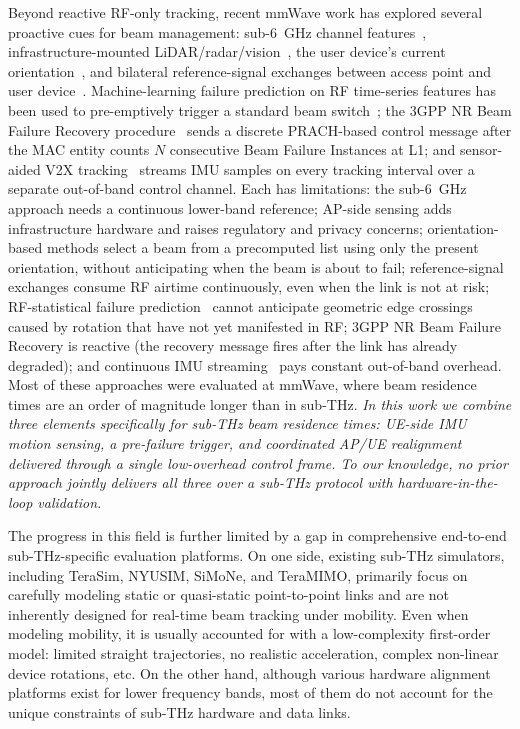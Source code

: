 \documentclass[fleqn,10pt]{wlscirep}
\newcommand{\rev}[1]{#1}
\begin{document}
Beyond reactive RF-only tracking, recent mmWave work has explored several proactive cues for beam management: sub-6~GHz channel features~\cite{Alrabeiah2020DeepLearning}, infrastructure-mounted LiDAR/radar/vision~\cite{Alkhateeb2023DeepSense, Jiang2023LiDAR, Morais2023Position}, the user device's current orientation~\cite{Rezaie2022Orientation, Struye2023CoVRage}, and bilateral reference-signal exchanges between access point and user device~\cite{Alkhateeb2018DLCB, Xue2023Standardization, Heng2021SixChallenges}. \rev{Machine-learning failure prediction on RF time-series features has been used to pre-emptively trigger a standard beam switch~\cite{9838772}; the 3GPP NR Beam Failure Recovery procedure~\cite{Giordani2018ATO, Heng2021SixChallenges} sends a discrete PRACH-based control message after the MAC entity counts $N$ consecutive Beam Failure Instances at L1; and sensor-aided V2X tracking~\cite{Brambilla_2019} streams IMU samples on every tracking interval over a separate out-of-band control channel.} Each has limitations: the sub-6~GHz approach needs a continuous lower-band reference; AP-side sensing adds infrastructure hardware and raises regulatory and privacy concerns; orientation-based methods select a beam from a precomputed list using only the present orientation, without anticipating when the beam is about to fail; reference-signal exchanges consume RF airtime continuously, even when the link is not at risk; \rev{RF-statistical failure prediction~\cite{9838772} cannot anticipate geometric edge crossings caused by rotation that have not yet manifested in RF; 3GPP NR Beam Failure Recovery is reactive (the recovery message fires after the link has already degraded); and continuous IMU streaming~\cite{Brambilla_2019} pays constant out-of-band overhead}. Most of these approaches were evaluated at mmWave, where beam residence times are an order of magnitude longer than in sub-THz. \emph{In this work we combine three elements specifically for sub-THz beam residence times: UE-side IMU motion sensing, a pre-failure trigger, and coordinated AP/UE realignment delivered through a single low-overhead control frame. To our knowledge, no prior approach jointly delivers all three over a sub-THz protocol with hardware-in-the-loop validation.}

The progress in this field is further limited by a gap in comprehensive end-to-end sub-THz-specific evaluation platforms. On one side, existing sub-THz simulators, including TeraSim\cite{HOSSAIN2019100004}, NYUSIM\cite{10367974}, SiMoNe\cite{rose2015simone, eckhardt2022modular}, and TeraMIMO\cite{tarboush2021teramimo, bodet2023directional}, primarily focus on carefully modeling static or quasi-static point-to-point links and are not inherently designed for real-time beam tracking under mobility\cite{Petrov2023Mobile}. Even when modeling mobility, it is usually accounted for with a low-complexity first-order model: limited straight trajectories, no realistic acceleration, complex non-linear device rotations, etc. On the other hand, although various hardware alignment platforms exist for lower frequency bands\cite{Abdulwahab2020, Keshavamurthy2022, AlAkkoumi2008}, most of them do not account for the unique constraints of sub-THz hardware and data links.
\end{document}
